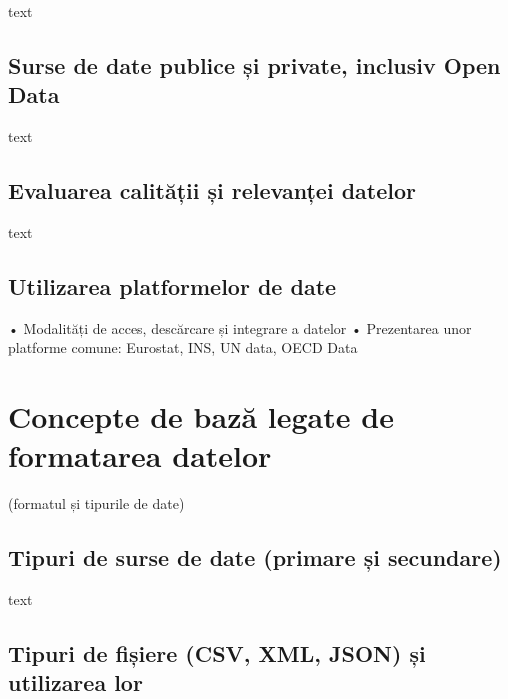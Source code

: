 \documentclass[
  11pt,
  b5paper,
  nottoc]{book}
\begin{document}
text

\hypertarget{surse-de-date-publice-ux219i-private-inclusiv-open-data-5}{%
\subsection{Surse de date publice și private, inclusiv Open
Data}\label{surse-de-date-publice-ux219i-private-inclusiv-open-data-5}}

text

\hypertarget{evaluarea-calitux103ux21bii-ux219i-relevanux21bei-datelor-5}{%
\subsection{Evaluarea calității și relevanței
datelor}\label{evaluarea-calitux103ux21bii-ux219i-relevanux21bei-datelor-5}}

text

\hypertarget{utilizarea-platformelor-de-date-5}{%
\subsection{Utilizarea platformelor de
date}\label{utilizarea-platformelor-de-date-5}}

• Modalități de acces, descărcare și integrare a datelor • Prezentarea
unor platforme comune: Eurostat, INS, UN data, OECD Data

\hypertarget{concepte-de-bazux103-legate-de-formatarea-datelor-5}{%
\section{Concepte de bază legate de formatarea
datelor}\label{concepte-de-bazux103-legate-de-formatarea-datelor-5}}

(formatul și tipurile de date)

\hypertarget{tipuri-de-surse-de-date-primare-ux219i-secundare-5}{%
\subsection{Tipuri de surse de date (primare și
secundare)}\label{tipuri-de-surse-de-date-primare-ux219i-secundare-5}}

text

\hypertarget{tipuri-de-fiux219iere-csv-xml-json-ux219i-utilizarea-lor-5}{%
\subsection{Tipuri de fișiere (CSV, XML, JSON) și utilizarea
lor}\label{tipuri-de-fiux219iere-csv-xml-json-ux219i-utilizarea-lor-5}}
\end{document}
